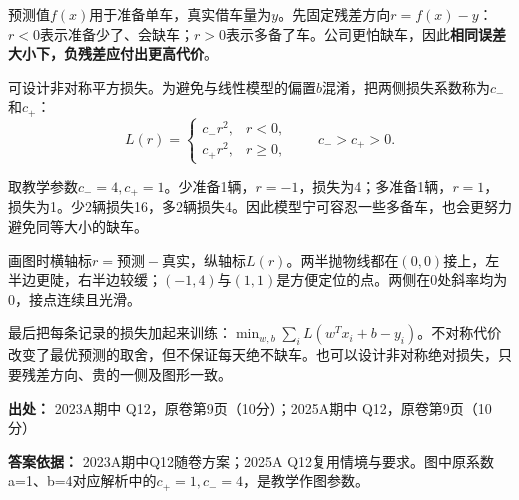 预测值\(f(x)\)用于准备单车，真实借车量为\(y\)。先固定残差方向\(r=f(x)-y\)：\(r<0\)表示准备少了、会缺车；\(r>0\)表示多备了车。公司更怕缺车，因此\textbf{相同误差大小下，负残差应付出更高代价}。


可设计非对称平方损失。为避免与线性模型的偏置\(b\)混淆，把两侧损失系数称为\(c_-\)和\(c_+\)：
\[
L(r)=\begin{cases}c_-r^2,&r<0,\\c_+r^2,&r\ge0,\end{cases}
\qquad c_->c_+>0.
\]


取教学参数\(c_-=4,c_+=1\)。少准备1辆，\(r=-1\)，损失为4；多准备1辆，\(r=1\)，损失为1。少2辆损失16，多2辆损失4。因此模型宁可容忍一些多备车，也会更努力避免同等大小的缺车。


画图时横轴标\(r=\text{预测}-\text{真实}\)，纵轴标\(L(r)\)。两半抛物线都在\((0,0)\)接上，左半边更陡，右半边较缓；\((-1,4)\)与\((1,1)\)是方便定位的点。两侧在0处斜率均为0，接点连续且光滑。




最后把每条记录的损失加起来训练：\(\min_{w,b}\sum_iL(w^Tx_i+b-y_i)\)。不对称代价改变了最优预测的取舍，但不保证每天绝不缺车。也可以设计非对称绝对损失，只要残差方向、贵的一侧及图形一致。


\textbf{出处：} 2023A期中 Q12，原卷第9页（10分）；2025A期中 Q12，原卷第9页（10分）


\textbf{答案依据：} 2023A期中Q12随卷方案；2025A Q12复用情境与要求。图中原系数a=1、b=4对应解析中的\(c_+=1,c_-=4\)，是教学作图参数。
